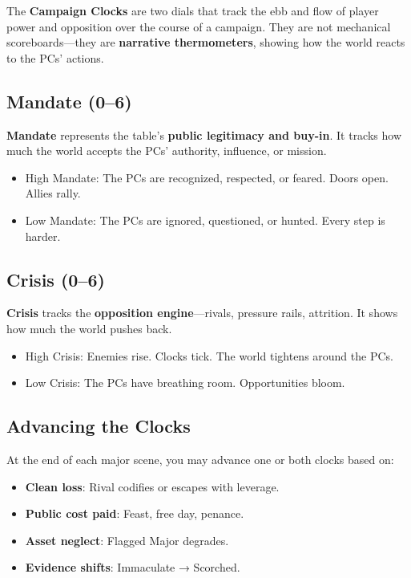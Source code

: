 The \textbf{Campaign Clocks} are two dials that track the ebb and flow of player power and opposition over the course of a campaign. They are not mechanical scoreboards—they are \textbf{narrative thermometers}, showing how the world reacts to the PCs' actions.

\subsection*{Mandate (0–6)}

\textbf{Mandate} represents the table's \textbf{public legitimacy and buy-in}. It tracks how much the world accepts the PCs' authority, influence, or mission.

\begin{itemize}
    \item High Mandate: The PCs are recognized, respected, or feared. Doors open. Allies rally.
    \item Low Mandate: The PCs are ignored, questioned, or hunted. Every step is harder.
\end{itemize}

\subsection*{Crisis (0–6)}

\textbf{Crisis} tracks the \textbf{opposition engine}—rivals, pressure rails, attrition. It shows how much the world pushes back.

\begin{itemize}
    \item High Crisis: Enemies rise. Clocks tick. The world tightens around the PCs.
    \item Low Crisis: The PCs have breathing room. Opportunities bloom.
\end{itemize}

\subsection*{Advancing the Clocks}

At the end of each major scene, you may advance one or both clocks based on:

\begin{itemize}
    \item \textbf{Clean loss}: Rival codifies or escapes with leverage.
    \item \textbf{Public cost paid}: Feast, free day, penance.
    \item \textbf{Asset neglect}: Flagged Major degrades.
    \item \textbf{Evidence shifts}: Immaculate → Scorched.
\end{itemize}

